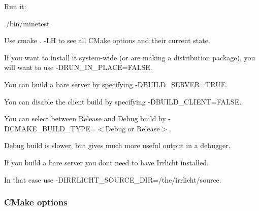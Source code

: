 Run it\+: \begin{DoxyVerb}./bin/minetest
\end{DoxyVerb}



\begin{DoxyItemize}
\item Use {\ttfamily cmake . -\/\+LH} to see all C\+Make options and their current state.
\item If you want to install it system-\/wide (or are making a distribution package), you will want to use {\ttfamily -\/\+D\+R\+U\+N\+\_\+\+I\+N\+\_\+\+P\+L\+A\+CE=F\+A\+L\+SE}.
\item You can build a bare server by specifying {\ttfamily -\/\+D\+B\+U\+I\+L\+D\+\_\+\+S\+E\+R\+V\+ER=T\+R\+UE}.
\item You can disable the client build by specifying {\ttfamily -\/\+D\+B\+U\+I\+L\+D\+\_\+\+C\+L\+I\+E\+NT=F\+A\+L\+SE}.
\item You can select between Release and Debug build by {\ttfamily -\/\+D\+C\+M\+A\+K\+E\+\_\+\+B\+U\+I\+L\+D\+\_\+\+T\+Y\+PE=$<$Debug or Release$>$}.
\begin{DoxyItemize}
\item Debug build is slower, but gives much more useful output in a debugger.
\end{DoxyItemize}
\item If you build a bare server you don\textquotesingle{}t need to have Irrlicht installed.
\begin{DoxyItemize}
\item In that case use {\ttfamily -\/\+D\+I\+R\+R\+L\+I\+C\+H\+T\+\_\+\+S\+O\+U\+R\+C\+E\+\_\+\+D\+IR=/the/irrlicht/source}.
\end{DoxyItemize}
\end{DoxyItemize}

\subsubsection*{C\+Make options}

